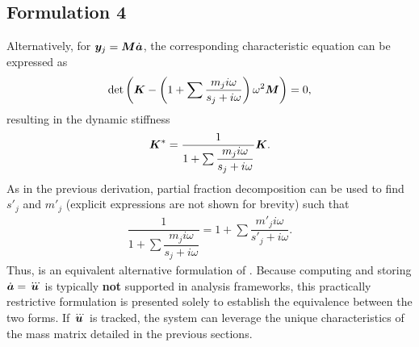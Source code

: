 \subsection{Formulation 4}\label{sec:v_dep_m}
Alternatively, for $\bm{y}_j=\bm{M}\dot{\bm{a}}$, the corresponding characteristic equation can be expressed as
\begin{gather}\label{eq:vel_cha2}
    \det\left(\bm{K}-\left(1+\sum\dfrac{m_ji\omega}{s_j+i\omega}\right)\omega^2\bm{M}\right)=0,
\end{gather}
resulting in the dynamic stiffness
\begin{gather}
    \bm{K}^*=\dfrac{1}{1+\sum\dfrac{m_ji\omega}{s_j+i\omega}}\bm{K}.
\end{gather}
As in the previous derivation, partial fraction decomposition can be used to find $s'_j$ and $m'_j$ (explicit expressions are not shown for brevity) such that
\begin{gather}\label{eq:rate_eqv}
    \dfrac{1}{1+\sum\dfrac{m_ji\omega}{s_j+i\omega}}=1+\sum\dfrac{m'_ji\omega}{s'_j+i\omega}.
\end{gather}
Thus,  is an equivalent alternative formulation of .
Because computing and storing $\dot{\bm{a}}=\dddot{\bm{u}}$ is typically \textbf{not} supported in analysis frameworks, this practically restrictive formulation is presented solely to establish the equivalence between the two forms.
If $\dddot{\bm{u}}$ is tracked, the system can leverage the unique characteristics of the mass matrix detailed in the previous sections.
